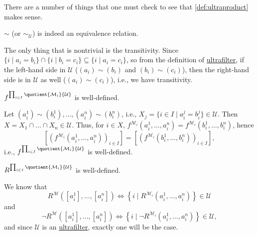 There are a number of things that one must check to see that \autoref{def:ultraproduct} makes sense.

\begin{claim}
	\(\sim \) (or \(\sim _\mathcal{U} \)) is indeed an equivalence relation.
\end{claim}
\begin{explanation}
	The only thing that is nontrivial is the transitivity. Since \(\{i \mid a_i = b_i\} \cap \{i \mid b_i = c_i\} \subseteq \{i \mid a_i = c_i\}\), so from the definition of \hyperref[def:ultrafilter]{ultrafilter}, if the left-hand side in \(\mathcal{U} \) (\((a_i) \sim (b_i)\) and \((b_i) \sim (c_i)\)), then the right-hand side is in \(\mathcal{U} \) as well (\((a_i) \sim (c_i)\)), i.e., we have transitivity.
\end{explanation}

\begin{claim}
	\(f^{\prod_{i\in I} \quotient{\mathcal{M} _i}{\mathcal{U} } }\) is well-defined.
\end{claim}
\begin{explanation}
	Let \((a_i^1) \sim (b_i^1), \dots , (a_i^n) \sim (b_i^n)\), i.e., \(X_j = \{i \in I \mid a_i^j = b_i^j\} \in \mathcal{U}\). Then \(X = X_1 \cap \dots \cap X_n \in \mathcal{U} \). Thus, for \(i\in X\), \(f^{\mathcal{M} _i}(a_i^1, \dots , a_i^n) = f^{\mathcal{M} _i}(b_i^1, \dots , b_i^n)\), hence
	\[
		[(f^{\mathcal{M} _i}(a_i^1, \dots , a_i^n))_{i\in I}] = [(f^{\mathcal{M} _i}(b_i^1, \dots , b_i^n))_{i\in I}],
	\]
	i.e., \(f^{\prod_{i\in I}^{} \quotient{\mathcal{M} _i}{\mathcal{U} } }\) is well-defined.
\end{explanation}

\begin{note}
	\(R^{\prod_{i\in I} \quotient{\mathcal{M} _i}{\mathcal{U} } }\) is well-defined.
\end{note}
\begin{explanation}
	We know that
	\[
		R^{\mathcal{M} }([a_i^1], \dots , [a_i^n]) \iff \left\{ i \mid R^{\mathcal{M} _i} (a_i^1, \dots , a_i^n)\right\} \in \mathcal{U}
	\]
	and
	\[
		\lnot R^{\mathcal{M} }([a_i^1], \dots , [a_i^n]) \iff \left\{ i \mid \lnot R^{\mathcal{M} _i} (a_i^1, \dots , a_i^n)\right\} \in \mathcal{U} ,
	\]
	and since \(\mathcal{U} \) is an \hyperref[def:ultrafilter]{ultrafilter}, exactly one will be the case.
\end{explanation}